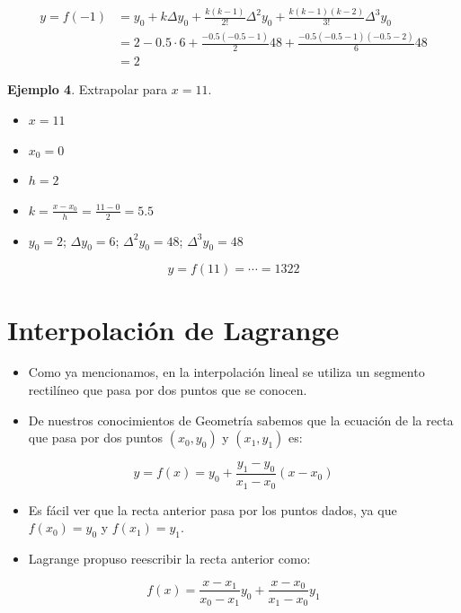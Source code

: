 \documentclass[]{book}
\providecommand{\tightlist}{%
  \setlength{\itemsep}{0pt}\setlength{\parskip}{0pt}}
\begin{document}
\[
\begin{aligned}
y = f(-1) &= y_0 + k \Delta y_0 + \frac{k(k-1)}{2!}\Delta^2 y_0 + \frac{k(k-1)(k-2)}{3!}\Delta^3 y_0\\
  & = 2 - 0.5 \cdot 6 + \frac{- 0.5 (- 0.5-1)}{2} 48 + \frac{- 0.5 (- 0.5-1)(- 0.5-2)}{6} 48 \\
  & = 2
\end{aligned}
\]

\textbf{Ejemplo 4}. Extrapolar para \(x = 11\).

\begin{itemize}
\tightlist
\item
  \(x = 11\)
\item
  \(x_0 = 0\)
\item
  \(h = 2\)
\item
  \(k = \frac{x-x_0}{h} = \frac{11-0}{2} = 5.5\)
\item
  \(y_0 = 2\); \(\Delta y_0 = 6\); \(\Delta^2 y_0 = 48\); \(\Delta^3 y_0 = 48\)
\end{itemize}

\[
y = f(11) = \cdots = 1322
\]

\hypertarget{interpolaciuxf3n-de-lagrange}{%
\section{Interpolación de Lagrange}\label{interpolaciuxf3n-de-lagrange}}

\begin{itemize}
\tightlist
\item
  Como ya mencionamos, en la interpolación lineal se utiliza un segmento rectilíneo que pasa por dos puntos que se conocen.
\item
  De nuestros conocimientos de Geometría sabemos que la ecuación de la recta que pasa por dos puntos \((x_0, y_0)\) y \((x_1, y_1)\) es:
\end{itemize}

\[
y = f(x) = y_0 + \frac{y_1 - y_0}{x_1 - x_0} (x - x_0)
\]

\begin{itemize}
\item
  Es fácil ver que la recta anterior pasa por los puntos dados, ya que \(f(x_0) = y_0\) y \(f(x_1) = y_1\).
\item
  Lagrange propuso reescribir la recta anterior como:
\end{itemize}

\[
f(x) = \frac{x - x_1}{x_0 - x_1} y_0 + \frac{x - x_0}{x_1 - x_0} y_1
\]
\end{document}
